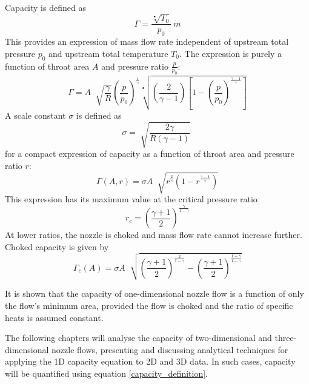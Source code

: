 \documentclass[11pt, twoside]{report}
\begin{document}
Capacity is defined as
\begin{equation}\label{capacity_definition}
\Gamma = \frac{\sqrt[•]{T_0}}{p_0}  \>
\dot{m}
\end{equation}
This provides an expression of mass flow rate independent of upstream total pressure $p_0$ and upstream total temperature $T_0$. The expression is purely a function of throat area $A$ and pressure ratio $\frac{p}{p_0}$:
\begin{equation}
\Gamma =
A \;
\sqrt[]{\frac{\gamma}{R}}
\left(
    \frac{p}{p_0}
\right)^\frac{1}{\gamma}
\sqrt[•]{
	\left(
		\frac{2}{\gamma - 1}  
	\right)
	\left[
		1 - \left( \frac{p}{p_0} \right)^\frac{\gamma-1}{\gamma}
	\right] 
}
\end{equation}
A scale constant $\sigma$ is defined as
\begin{equation}
\sigma = 
\sqrt[]{\frac{2\gamma}{R\left(\gamma-1\right)}} \;
\end{equation}
for a compact expression of capacity as a function of throat area and pressure ratio $r$:
\begin{equation}
\Gamma \left( A, r \right) = 
\sigma
A \;
\sqrt[]{
	r^\frac{2}{\gamma}
	\left(
		1 - r ^\frac{\gamma-1}{\gamma}
	\right) 
}
\end{equation}
This expression has its maximum value at the critical pressure ratio
\begin{equation}
r_c =
\left(
	\frac{\gamma+1}{2}
\right)
^\frac{\gamma}{1-\gamma}
\end{equation}
At lower ratios, the nozzle is choked and mass flow rate cannot increase further. Choked capacity is given by
\begin{equation}\label{choked_capacity_from_area}
\Gamma_c \left( A \right) =
\sigma
A \;
\sqrt[]{
	\left(
		\frac{\gamma + 1}{2}  
	\right)
	^\frac{2}{1-\gamma}
	-
	\left(
		\frac{\gamma + 1}{2}  
	\right)
	^\frac{1+\gamma}{1-\gamma}
}
\end{equation}

It is shown that the capacity of one-dimensional nozzle flow is a function of only the flow's minimum area, provided the flow is choked and the ratio of specific heats is assumed constant. 

The following chapters will analyse the capacity of two-dimensional and three-dimensional nozzle flows, presenting and discussing analytical techniques for applying the 1D capacity equation to 2D and 3D data. In such cases, capacity will be quantified using equation \ref{capacity_definition}.

\end{document}
